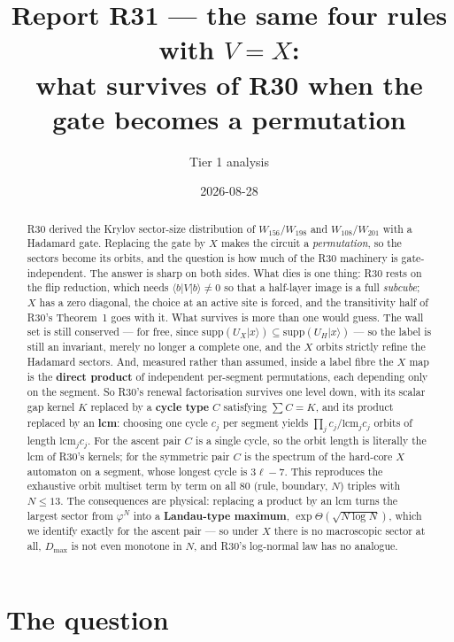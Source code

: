 \documentclass[11pt]{article}
\title{\textbf{Report R31 --- the same four rules with $V=X$:\\
what survives of R30 when the gate becomes a permutation}}
\author{Tier 1 analysis}
\date{2026-08-28}
\theoremstyle{plain}
\theoremstyle{remark}
\begin{document}
\maketitle

\begin{abstract}
R30 derived the Krylov sector-size distribution of $W_{156}/W_{198}$ and
$W_{108}/W_{201}$ with a Hadamard gate. Replacing the gate by $X$ makes the
circuit a \emph{permutation}, so the sectors become its orbits, and the question
is how much of the R30 machinery is gate-independent. The answer is sharp on both
sides. What dies is one thing: R30 rests on the flip reduction, which needs
$\langle b|V|b\rangle\ne0$ so that a half-layer image is a full \emph{subcube};
$X$ has a zero diagonal, the choice at an active site is forced, and the
transitivity half of R30's Theorem~1 goes with it. What survives is more than one
would guess. The wall set is still conserved --- for free, since
$\mathrm{supp}(U_X|x\rangle)\subseteq\mathrm{supp}(U_H|x\rangle)$ --- so the label
is still an invariant, merely no longer a complete one, and the $X$ orbits
strictly refine the Hadamard sectors. And, measured rather than assumed, inside a
label fibre the $X$ map is the \textbf{direct product} of independent
per-segment permutations, each depending only on the segment. So R30's renewal
factorisation survives one level down, with its scalar gap kernel $K$ replaced by
a \textbf{cycle type} $C$ satisfying $\sum C=K$, and its product replaced by an
\textbf{lcm}: choosing one cycle $c_j$ per segment yields $\prod_j c_j/\mathrm{lcm}_j c_j$
orbits of length $\mathrm{lcm}_j c_j$. For the ascent pair $C$ is a single cycle,
so the orbit length is literally the lcm of R30's kernels; for the symmetric pair
$C$ is the spectrum of the hard-core $X$ automaton on a segment, whose longest
cycle is $3\ell-7$. This reproduces the exhaustive orbit multiset term by term on
all $80$ (rule, boundary, $N$) triples with $N\le13$. The consequences are
physical: replacing a product by an lcm turns the largest sector from
$\varphi^N$ into a \textbf{Landau-type maximum}, $\exp\Theta(\sqrt{N\log N})$,
which we identify exactly for the ascent pair --- so under $X$ there is no
macroscopic sector at all, $D_{\max}$ is not even monotone in $N$, and R30's
log-normal law has no analogue.
\end{abstract}

\tableofcontents

\section{The question}
\end{document}
